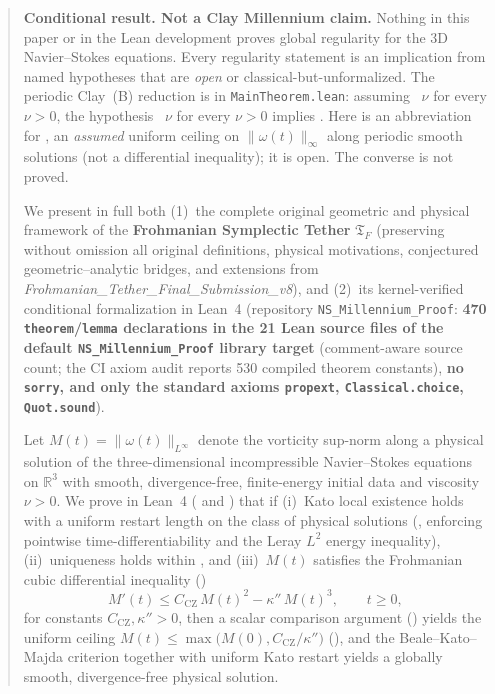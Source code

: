 \documentclass[11pt,a4paper]{article}
\theoremstyle{plain}
\theoremstyle{definition}
\theoremstyle{remark}
\newcommand{\Tf}{\mathfrak{T}_F}
\newcommand{\CZ}{C_{\mathrm{CZ}}}
\begin{document}
\begin{abstract}
\textbf{Conditional result. Not a Clay Millennium claim.} Nothing in this paper or in the Lean development proves global regularity for the 3D Navier--Stokes equations. Every regularity statement is an implication from named hypotheses that are \emph{open} or classical-but-unformalized. The periodic Clay~(B) reduction is  in \texttt{MainTheorem.lean}: assuming ~$\nu$ for every $\nu>0$, the hypothesis ~$\nu$ for every $\nu>0$ implies . Here  is an abbreviation for , an \emph{assumed} uniform ceiling on $\|\omega(t)\|_\infty$ along periodic smooth solutions (not a differential inequality); it is open. The converse is not proved.

We present in full both (1)~the complete original geometric and physical framework of the \textbf{Frohmanian Symplectic Tether} $\Tf$ (preserving without omission all original definitions, physical motivations, conjectured geometric--analytic bridges, and extensions from \emph{Frohmanian\_Tether\_Final\_Submission\_v8}), and (2)~its kernel-verified conditional formalization in Lean~4 (repository \texttt{NS\_Millennium\_Proof}: \textbf{470 \texttt{theorem}/\texttt{lemma} declarations in the 21 Lean source files of the default \texttt{NS\_Millennium\_Proof} library target} (comment-aware source count; the CI axiom audit reports 530 compiled theorem constants), \textbf{no \texttt{sorry}, and only the standard axioms \texttt{propext}, \texttt{Classical.choice}, \texttt{Quot.sound}}).

Let $M(t)=\|\omega(t)\|_{L^\infty}$ denote the vorticity sup-norm along a physical solution of the three-dimensional incompressible Navier--Stokes equations on $\mathbb{R}^3$ with smooth, divergence-free, finite-energy initial data and viscosity $\nu>0$. We prove in Lean~4 ( and ) that if (i)~Kato local existence holds with a uniform restart length on the class of physical solutions (, enforcing pointwise time-differentiability and the Leray $L^2$ energy inequality), (ii)~uniqueness holds within , and (iii)~$M(t)$ satisfies the Frohmanian cubic differential inequality ()
\[
M'(t)\le \CZ\,M(t)^2-\kappa''\,M(t)^3,\qquad t\ge 0,
\]
for constants $\CZ,\kappa''>0$, then a scalar comparison argument () yields the uniform ceiling $M(t)\le\max\bigl(M(0),\CZ/\kappa''\bigr)$ (), and the Beale--Kato--Majda criterion together with uniform Kato restart yields a globally smooth, divergence-free physical solution.


\end{abstract}
\end{document}
